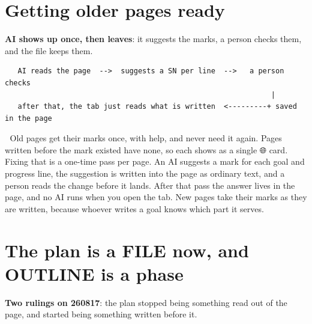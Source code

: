 \section{Getting older pages ready}
\textbf{AI shows up once, then leaves}: it suggests the marks, a person checks them, and the file keeps them.

\begin{verbatim}
   AI reads the page  -->  suggests a SN per line  -->   a person checks
                                                              |
   after that, the tab just reads what is written  <---------+ saved in the page
\end{verbatim}
📌 Old pages get their marks once, with help, and never need it again. Pages written before the mark existed have none, so each shows as a single 🌐 card. Fixing that is a one-time pass per page. An AI suggests a mark for each goal and progress line, the suggestion is written into the page as ordinary text, and a person reads the change before it lands. After that pass the answer lives in the page, and no AI runs when you open the tab. New pages take their marks as they are written, because whoever writes a goal knows which part it serves.


\section{The plan is a FILE now, and OUTLINE is a phase}
\textbf{Two rulings on 260817}: the plan stopped being something read out of the page, and started being something written before it.

